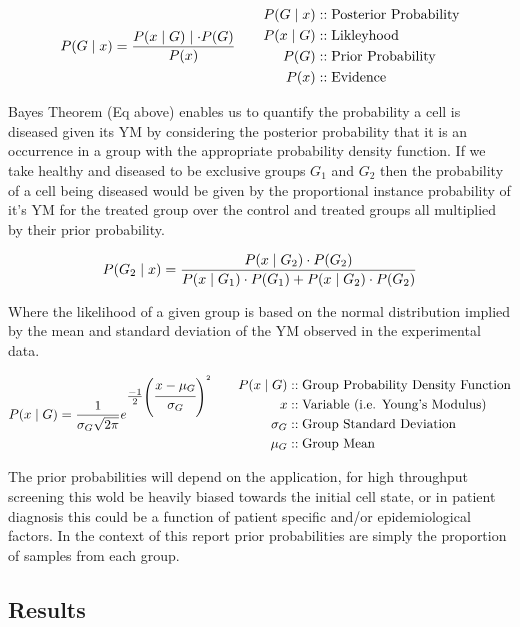 \documentclass[
  paper=a4,
  ,captions=tableheading
]{scrartcl}
\begin{document}
\[
{\Large  
P(G \mid x) = \frac{P(x \mid G) \mid \cdot P(G)}{P(x)}  
}  
\qquad  
\begin{align}  
P(G \mid x) &:: \text{Posterior Probability}\\
P(x \mid G) &:: \text{Likleyhood}\\
P(G)   &:: \text{Prior Probability}\\
P(x)   &:: \text{Evidence}\\
\end{align}
\]

Bayes Theorem (Eq above) enables us to quantify the probability a cell
is diseased given its YM by considering the posterior probability that
it is an occurrence in a group with the appropriate probability density
function. If we take healthy and diseased to be exclusive groups
\(G_{1}\) and \(G_{2}\) then the probability of a cell being diseased
would be given by the proportional instance probability of it's YM for
the treated group over the control and treated groups all multiplied by
their prior probability.

\[\large P(G_2 \mid x) = \frac{P(x \mid G_2) \cdot P(G_2)}{P(x \mid G_1) \cdot P(G_1) + P(x \mid G_2) \cdot P(G_2)}\]

Where the likelihood of a given group is based on the normal
distribution implied by the mean and standard deviation of the YM
observed in the experimental data.

\[
{\large  
P(x \mid G) =  
\frac{1}{\sigma_{G} \sqrt{2 \pi}}  
e^{\tfrac{-1}{2}  
\left( \cfrac{x-\mu_{G}}{\sigma_{G}}\right)^{2}}  
}  
\qquad  
\begin{align}  
P(x \mid G) &:: \text{Group Probability Density Function}\\
x           &:: \text{Variable (i.e. Young's Modulus)}\\
\sigma_{G}  &:: \text{Group Standard Deviation}\\
\mu_{G}     &:: \text{Group Mean}\\
\end{align}
\]

The prior probabilities will depend on the application, for high
throughput screening this wold be heavily biased towards the initial
cell state, or in patient diagnosis this could be a function of patient
specific and/or epidemiological factors. In the context of this report
prior probabilities are simply the proportion of samples from each
group.

\subsection{Results}\label{results}
\end{document}
